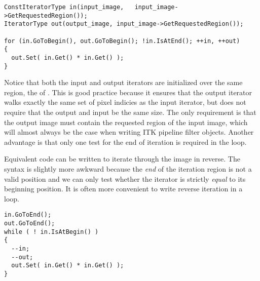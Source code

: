 \begin{verbatim}
ConstIteratorType in(input_image,   input_image->GetRequestedRegion());
IteratorType out(output_image, input_image->GetRequestedRegion());

for (in.GoToBegin(), out.GoToBegin(); !in.IsAtEnd(); ++in, ++out)
{
  out.Set( in.Get() * in.Get() );
}
\end{verbatim}

Notice that both the input and output iterators are initialized over the same
region, the  of .  This is good
practice because it ensures that the output iterator walks exactly the same set
of pixel indicies as the input iterator, but does not require that the output
and input be the same size.  The only requirement is that the output image must
contain the requested region of the input image, which will almost always be
the case when writing ITK pipeline filter objects.  Another advantage is that
only one test for the end of iteration is required in the  loop.

Equivalent code can be written to iterate through the image in reverse.
The syntax is slightly more awkward because the \emph{end} of the
iteration region is not a valid position and we can only test whether the
iterator is strictly \emph{equal} to its beginning position.  It is often more
convenient to write reverse iteration in a
 loop.

\begin{verbatim}
in.GoToEnd();
out.GoToEnd();
while ( ! in.IsAtBegin() )
{
  --in;
  --out;
  out.Set( in.Get() * in.Get() );
}

\end{verbatim}




